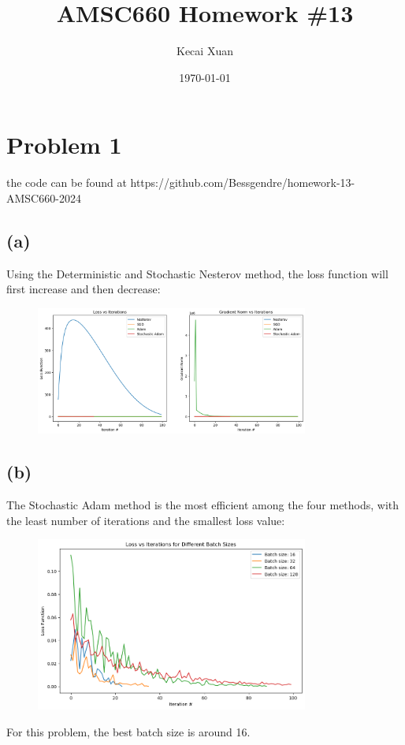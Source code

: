 \documentclass[12pt]{article}
\begin{document}
\setlength{\parindent}{0pt}

\title{AMSC660 Homework \#13}
\author{Kecai Xuan}
\date{\today}
\maketitle

\section*{Problem 1}

the code can be found at https://github.com/Bessgendre/homework-13-AMSC660-2024

\subsection*{(a)}

Using the Deterministic and Stochastic Nesterov method, the loss function will first increase and then decrease:
\begin{figure}[ht]
    \centering
    \includegraphics[width=0.8\textwidth]{./img/loss_compare.png}
\end{figure}

\subsection*{(b)}

The Stochastic Adam method is the most efficient among the four methods, with the least number of iterations and the smallest loss value:
\begin{figure}[ht]
    \centering
    \includegraphics[width=0.8\textwidth]{./img/adam_size.png}
\end{figure}
For this problem, the best batch size is around 16.
\end{document}
